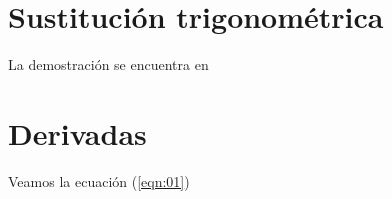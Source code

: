 \documentclass[11pt,a4paper]{book}
\begin{document}
\section{Sustitución trigonométrica}
La demostración se encuentra en \cite{GANGULY1997315}
\section{Derivadas}

Veamos la ecuación (\ref{eqn:01})
\printbibliography
\end{document}
